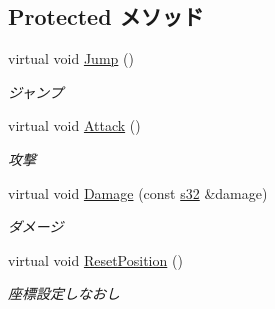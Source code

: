 \subsection*{Protected メソッド}
\begin{DoxyCompactItemize}
\item 
virtual void \hyperlink{class_man_a5ba5575d82480b8d414376b40dffc1e3}{Jump} ()
\begin{DoxyCompactList}\small\item\em ジャンプ \end{DoxyCompactList}\item 
virtual void \hyperlink{class_man_a3399a4016d8bc3f13a50041b4b03193a}{Attack} ()
\begin{DoxyCompactList}\small\item\em 攻撃 \end{DoxyCompactList}\item 
virtual void \hyperlink{class_man_a05ad50f87c07dd8f64a832388246e6e6}{Damage} (const \hyperlink{_main_8h_a0ce6887c26c1c49ad3be5710dd42bfd6}{s32} \&damage)
\begin{DoxyCompactList}\small\item\em ダメージ \end{DoxyCompactList}\item 
virtual void \hyperlink{class_man_a355179fbf349aaec3ee6032710138e7b}{Reset\-Position} ()
\begin{DoxyCompactList}\small\item\em 座標設定しなおし \end{DoxyCompactList}\end{DoxyCompactItemize}

